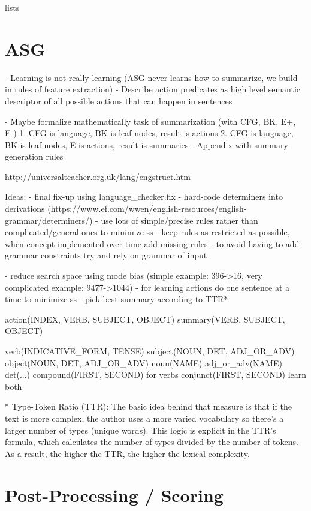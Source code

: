 \documentclass[12pt,twoside]{report}
\theoremstyle{definition}
\begin{document}
lists

\chapter{ASG}


- Learning is not really learning (ASG never learns how to summarize, we build in rules of feature extraction)
- Describe action predicates as high level semantic descriptor of all possible actions that can happen in sentences

- Maybe formalize mathematically task of summarization (with CFG, BK, E+, E-)
    1. CFG is language, BK is leaf nodes, result is actions
    2. CFG is language, BK is leaf nodes, E is actions, result is summaries
- Appendix with summary generation rules

http://universalteacher.org.uk/lang/engstruct.htm

Ideas:
- final fix-up using language\_checker.fix
- hard-code determiners into derivations (https://www.ef.com/wwen/english-resources/english-grammar/determiners/)
- use lots of simple/precise rules rather than complicated/general ones to minimize ss
- keep rules as restricted as possible, when concept implemented over time add missing rules
- to avoid having to add grammar constraints try and rely on grammar of input

- reduce search space using mode bias (simple example: 396->16, very complicated example: 9477->1044)
- for learning actions do one sentence at a time to minimize ss
- pick best summary according to TTR*

action(INDEX, VERB, SUBJECT, OBJECT)
summary(VERB, SUBJECT, OBJECT)

verb(INDICATIVE\_FORM, TENSE)
subject(NOUN, DET, ADJ\_OR\_ADV)
object(NOUN, DET, ADJ\_OR\_ADV)
noun(NAME)
adj\_or\_adv(NAME)
det(...)
compound(FIRST, SECOND)  for verbs
conjunct(FIRST, SECOND)  learn both

* Type-Token Ratio (TTR): The basic idea behind that measure is that if the text is more complex, the author uses a more varied vocabulary so there’s a larger number of types (unique words). This logic is explicit in the TTR’s formula, which calculates the number of types divided by the number of tokens. As a result, the higher the TTR, the higher the lexical complexity.

\chapter{Post-Processing / Scoring}

\end{document}
